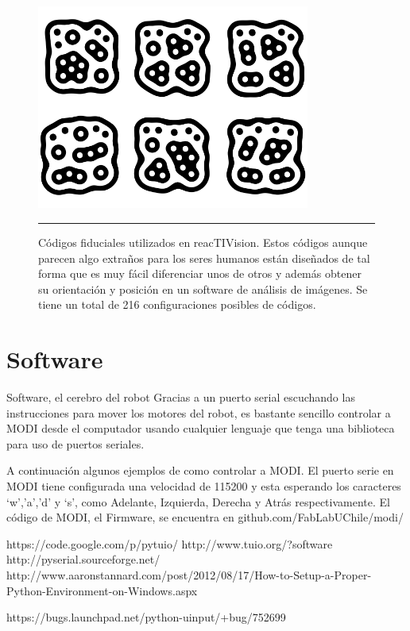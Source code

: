 \begin{figure}[htbp]
	\centering
		\includegraphics[width=0.8\textwidth]{./Figures/MODI/fiducial.png}
		\rule{35em}{0.5pt}
	\caption[Fiducial]{Códigos fiduciales utilizados en reacTIVision. Estos códigos aunque parecen algo extraños para los seres humanos están diseñados de tal forma que es muy fácil diferenciar unos de otros y además obtener su orientación y posición en un software de análisis de imágenes. Se tiene un total de 216 configuraciones posibles de códigos.}
	\label{fig:Fiducial}
\end{figure}


\section{Software}
Software, el cerebro del robot
Gracias a un puerto serial escuchando las instrucciones para mover los motores del robot, es bastante sencillo controlar a MODI desde el computador usando cualquier lenguaje que tenga una biblioteca para uso de puertos seriales.

A continuación algunos ejemplos de como controlar a MODI. El puerto serie en MODI tiene configurada una velocidad de 115200 y esta esperando los caracteres ‘w’,’a’,’d’ y ‘s’, como Adelante, Izquierda, Derecha y Atrás respectivamente. El código de MODI, el Firmware, se encuentra en github.com/FabLabUChile/modi/


https://code.google.com/p/pytuio/
http://www.tuio.org/?software
http://pyserial.sourceforge.net/
http://www.aaronstannard.com/post/2012/08/17/How-to-Setup-a-Proper-Python-Environment-on-Windows.aspx

https://bugs.launchpad.net/python-uinput/+bug/752699
